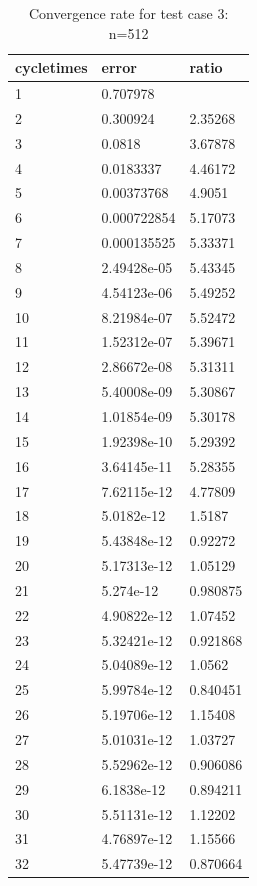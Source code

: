 \documentclass[UTF8]{ctexart}
\theoremstyle{plain}
\theoremstyle{definition}
\theoremstyle{remark}
\begin{document}
\begin{table}[H]
\centering
\begin{tabular}{|l|l|l|}
\hline
cycletimes & error & ratio\\\hline
1 & 0.707978&\\ \hline
2 & 0.300924& 2.35268\\ \hline
3 & 0.0818& 3.67878\\ \hline
4 & 0.0183337& 4.46172\\ \hline
5 & 0.00373768& 4.9051\\ \hline
6 & 0.000722854& 5.17073\\ \hline
7 & 0.000135525& 5.33371\\ \hline
8 & 2.49428e-05& 5.43345\\ \hline
9 & 4.54123e-06& 5.49252\\ \hline
10 & 8.21984e-07& 5.52472\\ \hline
11 & 1.52312e-07& 5.39671\\ \hline
12 & 2.86672e-08& 5.31311\\ \hline
13 & 5.40008e-09& 5.30867\\ \hline
14 & 1.01854e-09& 5.30178\\ \hline
15 & 1.92398e-10& 5.29392\\ \hline
16 & 3.64145e-11& 5.28355\\ \hline
17 & 7.62115e-12& 4.77809\\ \hline
18 & 5.0182e-12& 1.5187\\ \hline
19 & 5.43848e-12& 0.92272\\ \hline
20 & 5.17313e-12& 1.05129\\ \hline
21 & 5.274e-12& 0.980875\\ \hline
22 & 4.90822e-12& 1.07452\\ \hline
23 & 5.32421e-12& 0.921868\\ \hline
24 & 5.04089e-12& 1.0562\\ \hline
25 & 5.99784e-12& 0.840451\\ \hline
26 & 5.19706e-12& 1.15408\\ \hline
27 & 5.01031e-12& 1.03727\\ \hline
28 & 5.52962e-12& 0.906086\\ \hline
29 & 6.1838e-12& 0.894211\\ \hline
30 & 5.51131e-12& 1.12202\\ \hline
31 & 4.76897e-12& 1.15566\\ \hline
32 & 5.47739e-12& 0.870664\\ \hline
\end{tabular}
\caption{Convergence rate for test case 3: n=512}
\end{table}
\end{document}
